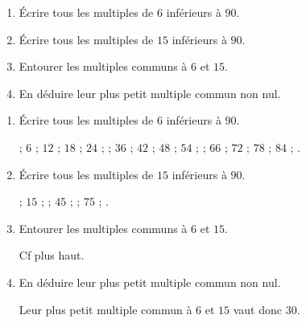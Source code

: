 \begin{exercice*}
    \begin{enumerate}
        \item Écrire tous les multiples de $6$ inférieurs à $90$.
        \item Écrire tous les multiples de $15$ inférieurs à $90$.
        \item Entourer les multiples communs à $6$ et $15$.
        \item En déduire leur plus petit multiple commun non nul.
    \end{enumerate}    
\end{exercice*}
\begin{corrige}
    \begin{enumerate}
        \item Écrire tous les multiples de $6$ inférieurs à $90$.
        
         ; $6$ ; $12$ ; $18$ ; $24$ ;  ; $36$ ; $42$ ; $48$ ; $54$ ;  ; $66$ ; $72$ ; $78$ ; $84$ ; .
        \item Écrire tous les multiples de $15$ inférieurs à $90$.
        
         ; $15$ ;  ; $45$ ;  ; $75$ ; .
        \item Entourer les multiples communs à $6$ et $15$.
        
        Cf plus haut.
        \item En déduire leur plus petit multiple commun non nul.
        
        Leur plus petit multiple commun à $6$ et $15$ vaut donc $30$.
    \end{enumerate}
\end{corrige}

